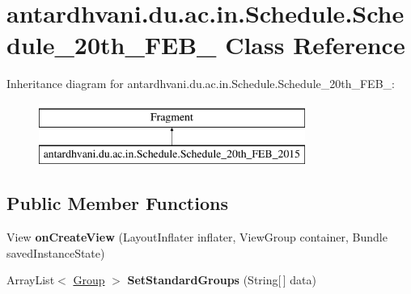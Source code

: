 \hypertarget{classantardhvani_1_1du_1_1ac_1_1in_1_1_schedule_1_1_schedule__20th___f_e_b__2015}{}\section{antardhvani.\+du.\+ac.\+in.\+Schedule.\+Schedule\+\_\+20th\+\_\+\+F\+E\+B\+\_ Class Reference}
\label{classantardhvani_1_1du_1_1ac_1_1in_1_1_schedule_1_1_schedule__20th___f_e_b__2015}
Inheritance diagram for antardhvani.\+du.\+ac.\+in.\+Schedule.\+Schedule\+\_\+20th\+\_\+\+F\+E\+B\+\_\+:\begin{figure}[H]
\begin{center}
\leavevmode
\includegraphics[height=2.000000cm]{classantardhvani_1_1du_1_1ac_1_1in_1_1_schedule_1_1_schedule__20th___f_e_b__2015}
\end{center}
\end{figure}
\subsection*{Public Member Functions}
\begin{DoxyCompactItemize}
\item 
\hypertarget{classantardhvani_1_1du_1_1ac_1_1in_1_1_schedule_1_1_schedule__20th___f_e_b__2015_ad91213337838740442239aa01bfc85f8}{}View {\bfseries on\+Create\+View} (Layout\+Inflater inflater, View\+Group container, Bundle saved\+Instance\+State)\label{classantardhvani_1_1du_1_1ac_1_1in_1_1_schedule_1_1_schedule__20th___f_e_b__2015_ad91213337838740442239aa01bfc85f8}

\item 
\hypertarget{classantardhvani_1_1du_1_1ac_1_1in_1_1_schedule_1_1_schedule__20th___f_e_b__2015_ae0eeb8b8ea39c581373f53b4bd966c4b}{}Array\+List$<$ \hyperlink{classantardhvani_1_1du_1_1ac_1_1in_1_1_adapter_1_1_group}{Group} $>$ {\bfseries Set\+Standard\+Groups} (String\mbox{[}$\,$\mbox{]} data)\label{classantardhvani_1_1du_1_1ac_1_1in_1_1_schedule_1_1_schedule__20th___f_e_b__2015_ae0eeb8b8ea39c581373f53b4bd966c4b}

\end{DoxyCompactItemize}

